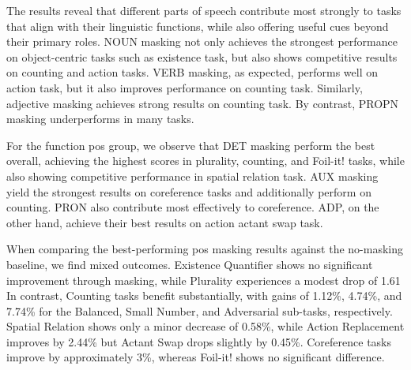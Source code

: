 The results reveal that different parts of speech contribute most strongly to tasks that align with their linguistic functions, while also offering useful cues beyond their primary roles.
NOUN masking not only achieves the strongest performance on object-centric tasks such as existence task, but also shows competitive results on counting and action tasks.
VERB masking, as expected, performs well on action task, but it also improves performance on counting task.
Similarly, adjective masking achieves strong results on counting task.
By contrast, PROPN masking underperforms in many tasks.

For the function \acrshort{pos} group, we observe that DET masking perform the best overall, achieving the highest scores in plurality, counting, and Foil-it! tasks, while also showing competitive performance in spatial relation task.
AUX masking yield the strongest results on coreference tasks and additionally perform on counting.
PRON also contribute most effectively to coreference.
ADP, on the other hand, achieve their best results on action actant swap task.

When comparing the best-performing \acrshort{pos} masking results against the no-masking baseline, we find mixed outcomes.
Existence Quantifier shows no significant improvement through masking, while Plurality experiences a modest drop of 1.61%
In contrast, Counting tasks benefit substantially, with gains of 1.12\%, 4.74\%, and 7.74\% for the Balanced, Small Number, and Adversarial sub-tasks, respectively.
Spatial Relation shows only a minor decrease of 0.58\%, while Action Replacement improves by 2.44\% but Actant Swap drops slightly by 0.45\%.
Coreference tasks improve by approximately 3\%, whereas Foil-it! shows no significant difference.

